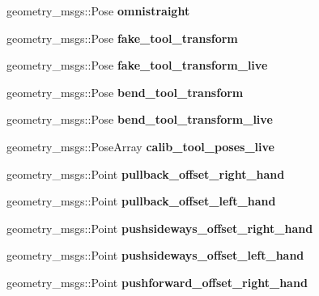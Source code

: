 \begin{DoxyCompactItemize}
geometry\+\_\+msgs\+::\+Pose {\bfseries omnistraight}
\item 
\mbox{\label{structManipulate_ad4488deca3e858622039a636885dcc78}} 
geometry\+\_\+msgs\+::\+Pose {\bfseries fake\+\_\+tool\+\_\+transform}
\item 
\mbox{\label{structManipulate_a502552b8ec94a17b0d5a6c17cf411370}} 
geometry\+\_\+msgs\+::\+Pose {\bfseries fake\+\_\+tool\+\_\+transform\+\_\+live}
\item 
\mbox{\label{structManipulate_a2a502fbb70b548a497fc2c6d2ca30bed}} 
geometry\+\_\+msgs\+::\+Pose {\bfseries bend\+\_\+tool\+\_\+transform}
\item 
\mbox{\label{structManipulate_aa53c6f07ae1ed893e71866cf74b9c54b}} 
geometry\+\_\+msgs\+::\+Pose {\bfseries bend\+\_\+tool\+\_\+transform\+\_\+live}
\item 
\mbox{\label{structManipulate_ad8268500448d0cf7ae278d4b6abe81c9}} 
geometry\+\_\+msgs\+::\+Pose\+Array {\bfseries calib\+\_\+tool\+\_\+poses\+\_\+live}
\item 
\mbox{\label{structManipulate_ace6ba689f7e88276ea82d18516d03f1a}} 
geometry\+\_\+msgs\+::\+Point {\bfseries pullback\+\_\+offset\+\_\+right\+\_\+hand}
\item 
\mbox{\label{structManipulate_a2467bc53041cef44d1d66ede8a868519}} 
geometry\+\_\+msgs\+::\+Point {\bfseries pullback\+\_\+offset\+\_\+left\+\_\+hand}
\item 
\mbox{\label{structManipulate_a9a9f5db33fe8a6f4452666f39947044f}} 
geometry\+\_\+msgs\+::\+Point {\bfseries pushsideways\+\_\+offset\+\_\+right\+\_\+hand}
\item 
\mbox{\label{structManipulate_ade87ed011144c15a5518741b70c8c865}} 
geometry\+\_\+msgs\+::\+Point {\bfseries pushsideways\+\_\+offset\+\_\+left\+\_\+hand}
\item 
\mbox{\label{structManipulate_ace91994f80e6d8a245fbcbf40097f575}} 
geometry\+\_\+msgs\+::\+Point {\bfseries pushforward\+\_\+offset\+\_\+right\+\_\+hand}

\end{DoxyCompactItemize}
